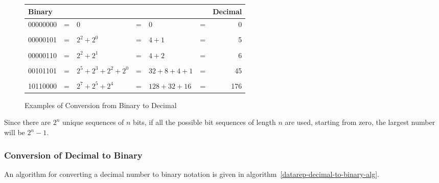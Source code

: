 \begin{figure}[hbtp]
\caption{Examples of Conversion from Binary to Decimal}
\label{datarep-bin-to-dec-figure}
\begin{center}
\begin{tabular}{|lclclcr|}
\hline
{\bf Binary}    & & & & & & {\bf Decimal} \\
\hline

00000000        & = &   $0$                     & = &
                        $0$                     & = & 0 \\
& & & & & & \\
00000101        & = & $2^2 + 2^0$               & = &
                        $4 + 1$                 & = & 5 \\
& & & & & & \\
00000110        & = & $2^2 + 2^1$               & = &
                        $4 + 2$                 & = & 6 \\
& & & & & & \\
00101101        & = & $2^5 + 2^3 + 2^2 + 2^0$   & = &
                        $32 + 8 + 4 + 1$        & = & 45 \\
& & & & & & \\
10110000        & = & $2^7 + 2^5 + 2^4$         & = &
                        $128 + 32 + 16$         & = & 176 \\
\hline
\end{tabular}
\end{center}
\end{figure}


Since there are $2^{n}$ unique sequences of $n$ bits,
if all the possible bit sequences of length $n$ are used,
starting from zero, the largest number will be $2^{n} - 1$.

\subsubsection{Conversion of Decimal to Binary}
\label{datarep-decimal-to-binary-algorithm}

An algorithm for converting a decimal number to binary notation is
given in algorithm~\ref{datarep-decimal-to-binary-alg}.

